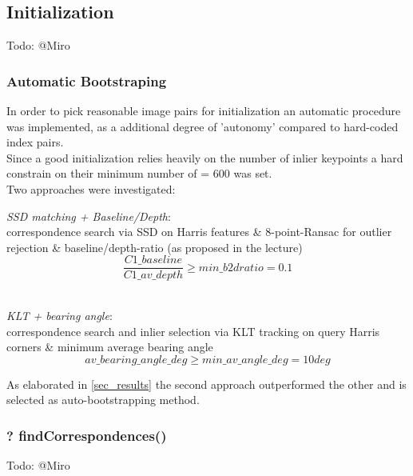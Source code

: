 \subsection{Initialization}
\label{sec_init}
Todo: @Miro

\subsubsection{Automatic Bootstraping}
\label{sec_boot}
In order to pick reasonable image pairs for initialization an automatic procedure was implemented, as a additional degree of 'autonomy' compared to hard-coded index pairs.\\
Since a good initialization relies heavily on the number of inlier keypoints a hard constrain on their minimum number of  = $600$ was set.\\

Two approaches were investigated:
\begin{compactitem}
	\item \textit{SSD matching + Baseline/Depth}:\\
	correspondence search via SSD on Harris features \& 8-point-Ransac for outlier rejection \& baseline/depth-ratio (as proposed in the lecture)\\
	\begin{equation}
		\frac{C1\_baseline}{C1\_av\_depth} \geqslant min\_b2dratio = 0.1
	\end{equation}\\
	
	\item \textit{KLT + bearing angle}:\\
	correspondence search and inlier selection via KLT tracking on query Harris corners \& minimum average bearing angle\\
	\begin{equation}
		av\_bearing\_angle\_deg \geqslant min\_av\_angle\_deg = 10 deg
	\end{equation}
\end{compactitem}

As elaborated in \cref{sec_results} the second approach outperformed the other and is selected as auto-bootstrapping method.


\subsubsection{? findCorrespondences()}
Todo: @Miro

